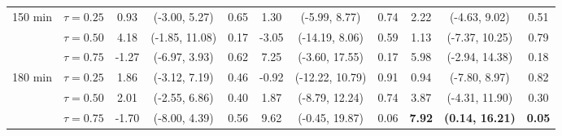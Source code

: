 \begin{table}[ht]
{\begin{tabular}{llccccccccc}
\midrule
\multirow{3}{*}{150 min} & $\tau=0.25$ & 0.93 & (-3.00, 5.27) & 0.65 & 1.30 & (-5.99, 8.77) & 0.74 & 2.22 & (-4.63, 9.02) & 0.51 \\
 & $\tau=0.50$ & 4.18 & (-1.85, 11.08) & 0.17 & -3.05 & (-14.19, 8.06) & 0.59 & 1.13 & (-7.37, 10.25) & 0.79 \\
 & $\tau=0.75$ & -1.27 & (-6.97, 3.93) & 0.62 & 7.25 & (-3.60, 17.55) & 0.17 & 5.98 & (-2.94, 14.38) & 0.18 \\
\midrule
\multirow{3}{*}{180 min} & $\tau=0.25$ & 1.86 & (-3.12, 7.19) & 0.46 & -0.92 & (-12.22, 10.79) & 0.91 & 0.94 & (-7.80, 8.97) & 0.82 \\
 & $\tau=0.50$ & 2.01 & (-2.55, 6.86) & 0.40 & 1.87 & (-8.79, 12.24) & 0.74 & 3.87 & (-4.31, 11.90) & 0.30 \\
 & $\tau=0.75$ & -1.70 & (-8.00, 4.39) & 0.56 & 9.62 & (-0.45, 19.87) & 0.06 & \textbf{7.92} & \textbf{(0.14, 16.21)} & \textbf{0.05} \\
\bottomrule
\end{tabular}%
}
\end{table}

